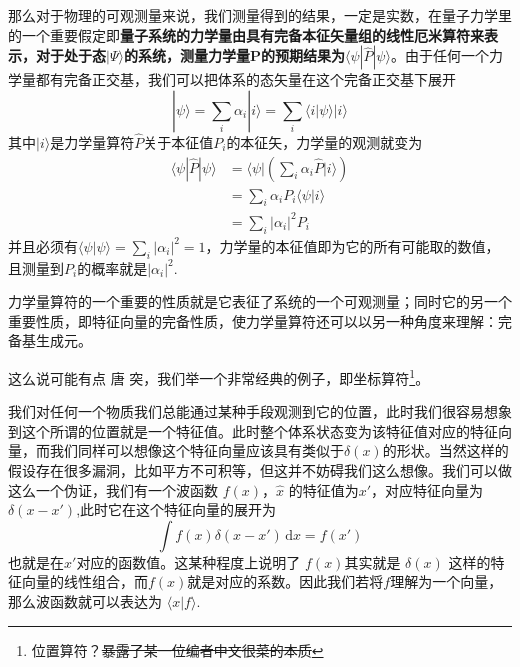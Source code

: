 \documentclass[12pt,a4paper,openany,twoside]{book}
\numberwithin{equation}{section}
\newcommand{\ud}{\mathrm{d}}
\begin{document}
        那么对于物理的可观测量来说，我们测量得到的结果，一定是实数，在量子力学里的一个重要假定即\textbf{量子系统的力学量由具有完备本征矢量组的线性厄米算符来表示，对于处于态}$ | \Psi \rangle $\textbf{的系统，测量力学量P的预期结果为}$ \langle\psi|\hat P| \psi\rangle$。由于任何一个力学量都有完备正交基，我们可以把体系的态矢量在这个完备正交基下展开
        \begin{equation}
          | \psi \rangle=\sum_{i} \alpha_{i} | i \rangle=\sum_{i}\langle i | \psi\rangle | i \rangle
        \end{equation}
        其中$ | i \rangle $是力学量算符$\hat{P}$关于本征值$P_i$的本征矢，力学量的观测就变为
        \begin{equation}
          \begin{aligned}
            \langle\psi|\hat{P}| \psi\rangle &=\langle\psi |\left(\sum_{i} \alpha_{i} \hat{P} | i\rangle\right) \\
            &=\sum_{i} \alpha_{i} P_{i}\langle\psi | i\rangle \\
            &=\sum_{i}\left|\alpha_{i}\right|^{2} P_{i}
          \end{aligned}
        \end{equation}
        并且必须有$\langle\psi | \psi\rangle=\sum_{i}\left|\alpha_{i}\right|^{2}=1$，力学量的本征值即为它的所有可能取的数值，且测量到$P_i$的概率就是$|\alpha_i|^2$.

        力学量算符的一个重要的性质就是它表征了系统的一个可观测量；同时它的另一个重要性质，即特征向量的完备性质，使力学量算符还可以以另一种角度来理解：完备基生成元。

        这么说可能有点 唐 突，我们举一个非常经典的例子，即坐标算符\footnote{位置算符？\sout{暴露了某一位编者中文很菜的本质}}。

        我们对任何一个物质我们总能通过某种手段观测到它的位置，此时我们很容易想象到这个所谓的位置就是一个特征值。此时整个体系状态变为该特征值对应的特征向量，而我们同样可以想像这个特征向量应该具有类似于$\delta (x)$的形状。当然这样的假设存在很多漏洞，比如平方不可积等，但这并不妨碍我们这么想像。我们可以做这么一个伪证，我们有一个波函数 $f(x)$，$\hat{x}$ 的特征值为$x'$，对应特征向量为 $\delta(x-x')$,此时它在这个特征向量的展开为
        \begin{equation*}
          \int f(x) \delta(x-x') \, \ud x = f(x')
        \end{equation*} 
        也就是在$x'$对应的函数值。这某种程度上说明了 $f(x)$其实就是 $\delta(x)$ 这样的特征向量的线性组合，而$f(x)$就是对应的系数。因此我们若将$f$理解为一个向量，那么波函数就可以表达为 $\langle x | f \rangle $.
\end{document}
